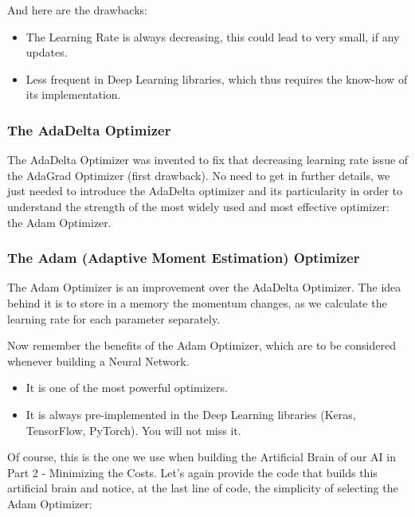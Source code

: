 \documentclass[]{book}
\begin{document}
And here are the drawbacks:

\begin{itemize}
    \item The Learning Rate is always decreasing, this could lead to very small, if any updates.
    \item Less frequent in Deep Learning libraries, which thus requires the know-how of its implementation.
\end{itemize}

\subsubsection{The AdaDelta Optimizer}

The AdaDelta Optimizer was invented to fix that decreasing learning rate issue of the AdaGrad Optimizer (first drawback). No need to get in further details, we just needed to introduce the AdaDelta optimizer and its particularity in order to understand the strength of the most widely used and most effective optimizer: the Adam Optimizer.

\subsubsection{The Adam (Adaptive Moment Estimation) Optimizer}

The Adam Optimizer is an improvement over the AdaDelta Optimizer. The idea behind it is to store in a memory the momentum changes, as we calculate the learning rate for each parameter separately.

Now remember the benefits of the Adam Optimizer, which are to be considered whenever building a Neural Network.

\begin{itemize}
    \item It is one of the most powerful optimizers.
    \item It is always pre-implemented in the Deep Learning libraries (Keras, TensorFlow, PyTorch). You will not miss it.
\end{itemize}

Of course, this is the one we use when building the Artificial Brain of our AI in Part 2 - Minimizing the Costs. Let's again provide the code that builds this artificial brain and notice, at the last line of code, the simplicity of selecting the Adam Optimizer:
\end{document}
